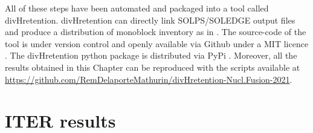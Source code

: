 All of these steps have been automated and packaged into a tool called divHretention.
divHretention can directly link SOLPS/SOLEDGE output files and produce a distribution of monoblock inventory as in .
The source-code of the tool is under version control and openly available via Github under a MIT licence \cite{delaporte-mathurin_irfmdivhretention_2021}.
The divHretention python package is distributed via PyPi \cite{delaporte-mathurin_divhretention_nodate}.
Moreover, all the results obtained in this Chapter can be reproduced with the scripts available at \url{https://github.com/RemDelaporteMathurin/divHretention-Nucl.Fusion-2021}.

\section{ITER results}

